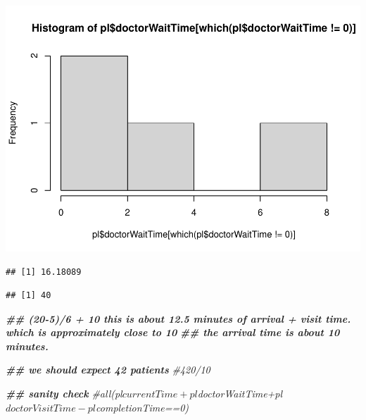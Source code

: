 \documentclass[
]{book}
\newenvironment{Shaded}{\begin{snugshade}}{\end{snugshade}}
\newcommand{\CommentTok}[1]{\textcolor[rgb]{0.56,0.35,0.01}{\textit{#1}}}
\newcommand{\DecValTok}[1]{\textcolor[rgb]{0.00,0.00,0.81}{#1}}
\newcommand{\DocumentationTok}[1]{\textcolor[rgb]{0.56,0.35,0.01}{\textbf{\textit{#1}}}}
\newcommand{\FunctionTok}[1]{\textcolor[rgb]{0.00,0.00,0.00}{#1}}
\newcommand{\NormalTok}[1]{#1}
\newcommand{\SpecialCharTok}[1]{\textcolor[rgb]{0.00,0.00,0.00}{#1}}
\theoremstyle{definition}
\theoremstyle{definition}
\theoremstyle{definition}
\theoremstyle{definition}
\theoremstyle{remark}
\begin{document}
\includegraphics{_main_files/figure-latex/unnamed-chunk-9-3.pdf}

\begin{Shaded}
\end{Shaded}

\begin{verbatim}
## [1] 16.18089
\end{verbatim}

\begin{Shaded}
\end{Shaded}

\begin{verbatim}
## [1] 40
\end{verbatim}

\begin{Shaded}
\begin{Highlighting}[]
\DocumentationTok{\#\# (20{-}5)/6 + 10 this is about 12.5 minutes of arrival + visit time. which is approximately close to 10 }
\DocumentationTok{\#\# the arrival time is about 10 minutes.  }

\DocumentationTok{\#\# we should expect 42 patients}
 \CommentTok{\#420/10}
  
  \DocumentationTok{\#\# sanity check}
  \CommentTok{\#all(pl$currentTime+pl$doctorWaitTime+pl$doctorVisitTime{-}pl$completionTime==0)}
\end{Highlighting}
\end{Shaded}
\end{document}
